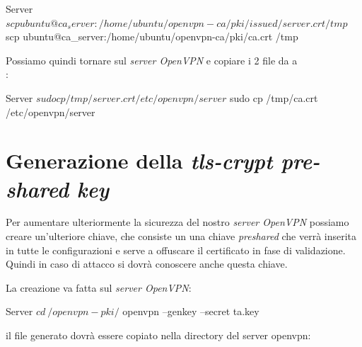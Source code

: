 \begin{bashcode}{Server}{}
$ scp ubuntu@ca_server:/home/ubuntu/openvpn-ca/pki/issued/server.crt /tmp
$ scp ubuntu@ca_server:/home/ubuntu/openvpn-ca/pki/ca.crt /tmp
\end{bashcode}

Possiamo quindi tornare sul \textit{server OpenVPN} e copiare i 2 file da  a \\:

\begin{bashcode}{Server}{}
$ sudo cp /tmp/server.crt /etc/openvpn/server
$ sudo cp /tmp/ca.crt /etc/openvpn/server
\end{bashcode}

\section{Generazione della \textit{tls-crypt pre-shared key}}
\label{sec:tls-crypt}

Per aumentare ulteriormente la sicurezza del nostro \textit{server OpenVPN} possiamo creare un'ulteriore chiave, che consiste un una chiave \textit{preshared} che verrà inserita in tutte le configurazioni e serve a offuscare il certificato in fase di validazione. Quindi in caso di attacco si dovrà conoscere anche questa chiave.

La creazione va fatta sul \textit{server OpenVPN}:

\begin{bashcode}{Server}{}
$ cd ~/openvpn-pki/
$ openvpn --genkey --secret ta.key
\end{bashcode}

il file generato  dovrà essere copiato nella directory del server openvpn:

